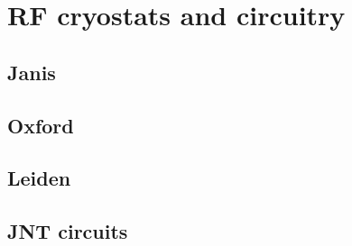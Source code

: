 \chapter{RF cryostats and circuitry}
\label{appen:RF_cryostats}

\section{Janis}

\section{Oxford}

\section{Leiden}

\section{JNT circuits}